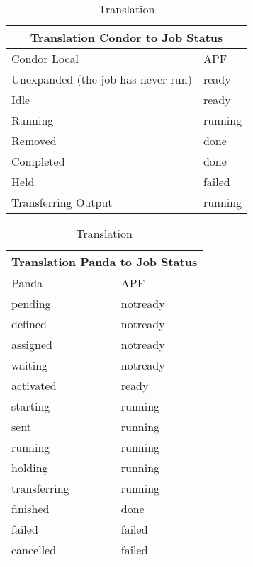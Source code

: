 \documentclass[a4paper]{jpconf}
\begin{document}
\begin{table}
\begin{tabular}{|l|l|}
\hline
\hline
\multicolumn{2}{|c|}{Translation Condor to Job Status} \\
\hline
\hline
Condor Local   & APF       \\ \hline
\hline
\hline
Unexpanded (the job has never run)    &   ready      \\ \hline
Idle                                  &   ready      \\ \hline
Running                               &   running    \\ \hline
Removed                               &   done       \\ \hline
Completed                             &   done       \\ \hline
Held                                  &   failed     \\ \hline
Transferring Output                   &   running    \\ \hline
\end{tabular}\caption{Translation}
\label{translation}
\end{table}


\begin{table}
\begin{tabular}{|l|l|}
\hline
\hline
\multicolumn{2}{|c|}{Translation Panda to Job Status} \\\hline
\hline
Panda         & APF       \\ \hline 
\hline
\hline
pending       & notready  \\ \hline
defined       & notready  \\ \hline
assigned      & notready  \\ \hline
waiting       & notready  \\ \hline
activated     & ready     \\ \hline
starting      & running   \\ \hline
sent          & running   \\ \hline
running       & running   \\ \hline
holding       & running   \\ \hline
transferring  & running   \\ \hline
finished      & done      \\ \hline
failed        & failed    \\ \hline
cancelled     & failed    \\ \hline
\end{tabular}\caption{Translation}
\label{translation}
\end{table}
\end{document}
